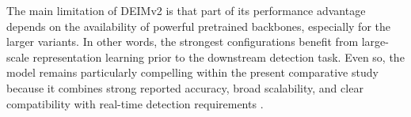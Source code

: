 The main limitation of DEIMv2 is that part of its performance advantage depends on the availability of powerful pretrained backbones, especially for the larger variants. In other words, the strongest configurations benefit from large-scale representation learning prior to the downstream detection task. Even so, the model remains particularly compelling within the present comparative study because it combines strong reported accuracy, broad scalability, and clear compatibility with real-time detection requirements \cite{huang_real-time_2026,zhao_detrs_2024}.
